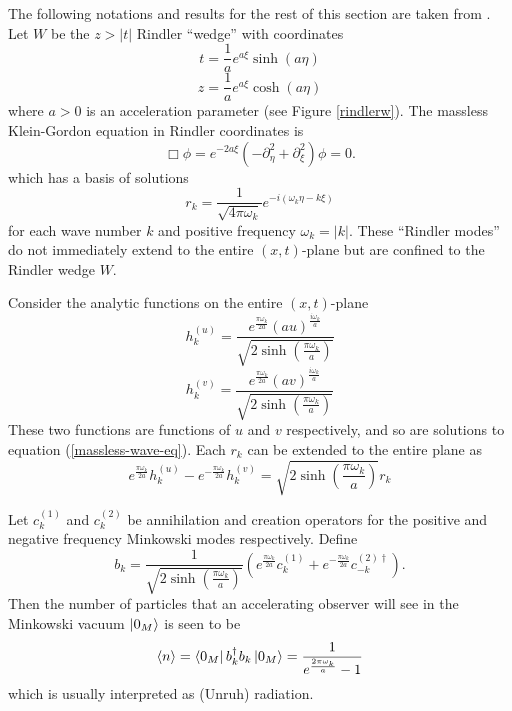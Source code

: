 \documentclass[12pt,a4paper]{article}
\begin{document}
The following notations and results for the rest of this section are taken from \cite{Frodden}. Let $W$ be the $z>|t|$ Rindler ``wedge'' with coordinates
\begin{equation}
  t = \frac{1}{a}e^{a\xi}\sinh{(a\eta)}
\label{sinh}
\end{equation}
\begin{equation}
z = \frac{1}{a}e^{a\xi}\cosh{(a\eta)}
\end{equation}
where $a>0$ is an acceleration parameter (see Figure \ref{rindlerw}). The massless Klein-Gordon equation in Rindler coordinates is
\begin{equation}
  \Box \phi = e^{-2a \xi}(-\partial_\eta^2 + \partial_\xi^2) \phi = 0.
\end{equation}
which has a basis of solutions 
\begin{equation}
 r_k = \frac{1}{\sqrt{4 \pi \omega_k}} e^{-i(\omega_k \eta -k \xi)}
\end{equation}
for each wave number $k$ and positive frequency $\omega_k = |k|$.  These ``Rindler modes'' do not immediately extend to the entire $(x,t)$-plane but are confined to the Rindler wedge $W$. 

Consider the analytic functions on the entire $(x,t)$-plane
\begin{equation}
h^{(u)}_k = \frac{e^{\frac{\pi \omega_k}{2a}} {(au)}^{\frac{i\omega_k}{a}}}{ \sqrt{2\sinh\left(\frac{\pi\omega_k}{a}\right)}}
\end{equation}
\begin{equation}
h^{(v)}_k = \frac{e^{\frac{\pi \omega_k}{2a}} {(av)}^{\frac{i\omega_k}{a}}}{ \sqrt{2\sinh\left(\frac{\pi\omega_k}{a}\right)} }
\end{equation}
These two functions are functions of $u$ and $v$ respectively, and so are solutions to equation (\ref{massless-wave-eq}).  Each $r_k$ can be extended to the entire plane as
\begin{equation}
e^\frac{\pi\omega_k}{2a} h^{(u)}_k - e^{-\frac{\pi\omega_k}{2a}} h^{(v)}_k  = \sqrt{2 \sinh \left({\frac{\pi\omega_k}{a}}\right)} r_k
\end{equation}

Let $c_k^{(1)}$ and $c_k^{(2)}$ be annihilation and creation operators for the positive and negative frequency Minkowski modes respectively.  Define
\begin{equation}
  b_k = \frac{1}{\sqrt{2 \sinh\left(\frac{\pi \omega_k}{a}\right)}} \left( e^{\frac{\pi\omega_k}{2a}} c_k^{(1)} + e^{-\frac{\pi\omega_k}{2a}} c_{-k}^{(2) \dagger} \right).
\end{equation}
Then the number of particles that an accelerating observer will see in the Minkowski vacuum $\ket{0_M}$ is seen to be 
\begin{equation}
\label{radeq}
\braket{n} = \bra{0_M} b_k^\dagger b_k \ket{0_M} = \frac{1}{e^{\frac{2 \pi \omega_k}{a}}-1}
\end{equation}
which is usually interpreted as (Unruh) radiation.
\end{document}
